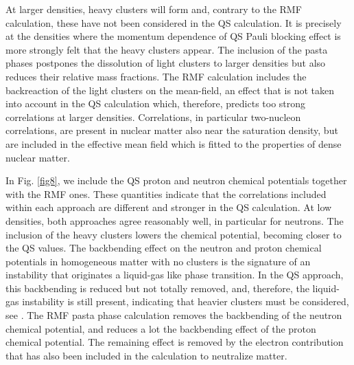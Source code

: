 \documentclass[aps,prc,nofootinbib,twocolumn,showpacs]{revtex4-1}
\begin{document}
At larger densities, heavy clusters will  form and, contrary to the RMF
calculation, these have not been
considered in the QS calculation. It is precisely at the densities
where the momentum dependence of QS  Pauli blocking effect is more
strongly felt that the heavy clusters appear. The inclusion of the pasta phases postpones the dissolution of light clusters to larger densities but also reduces their relative mass fractions. The RMF
calculation includes the backreaction of the light clusters on the
mean-field, an effect that is not taken into account in the QS
calculation which,  therefore, predicts too strong correlations at
larger densities.  Correlations, in particular two-nucleon correlations, are present in nuclear matter also near the saturation density, but are included in the effective mean field which is fitted to the properties of dense nuclear matter.

In Fig. \ref{fig8}, we include the QS proton and neutron
chemical potentials together with the RMF ones.  These quantities
indicate that the correlations included within each approach are
different and stronger in the QS calculation. At low densities, both approaches agree reasonably well, in
particular for neutrons. The inclusion of the heavy clusters lowers the chemical
potential, becoming closer to the QS values.  The backbending effect on
the neutron and proton chemical potentials in homogeneous matter with
no clusters is the signature of an instability that originates a
liquid-gas like phase transition. In the QS approach, this backbending is
reduced but not totally removed, and, therefore, the liquid-gas
instability is still present,  indicating that heavier clusters must be
considered, see \cite{raduta10}. The RMF pasta phase calculation removes
the backbending of the neutron chemical potential, and reduces a lot
the backbending effect of the proton chemical potential. The remaining
effect is removed by the electron contribution that has also been
included in the calculation to neutralize matter.
\end{document}
